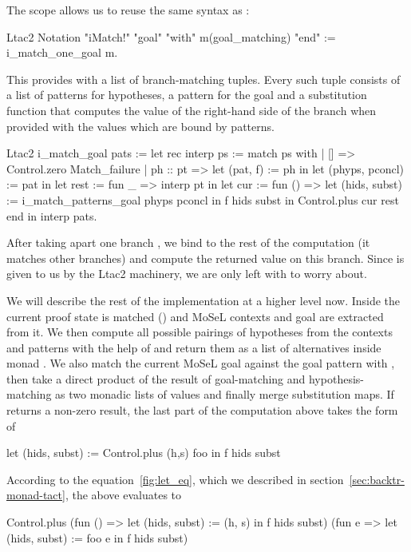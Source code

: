 The  scope allows us to reuse the same syntax as :
\begin{coq}
Ltac2 Notation "iMatch!" "goal" "with" m(goal_matching) "end" :=
  i_match_one_goal m.
\end{coq}
This provides  with a list of branch-matching tuples.
Every such tuple consists of a list of patterns for hypotheses, a pattern for the goal and a substitution function that computes the value of the right-hand side of the branch when provided with the values which are bound by patterns.

\begin{coq}
Ltac2 i_match_goal pats :=
  let rec interp ps := match ps with
  | [] => Control.zero Match_failure
  | ph :: pt =>
    let (pat, f) := ph in
    let (phyps, pconcl) := pat in
    let rest := fun _ => interp pt in
    let cur := fun () =>
      let (hids, subst) := i_match_patterns_goal phyps pconcl in
      f hids subst
    in Control.plus cur rest
  end in
  interp pats.
\end{coq}

After taking apart one branch , we bind  to the rest of the computation (it matches other branches) and compute the returned value on this branch.
Since  is given to us by the Ltac2 machinery, we are only left with  to worry about.

We will describe the rest of the implementation at a higher level now.
Inside  the current proof state is matched () and MoSeL contexts and goal are extracted from it.
We then compute all possible pairings of hypotheses from the contexts and patterns with the help of  and return them as a list of alternatives inside monad .
We also match the current MoSeL goal against the goal pattern  with , then take a direct product of the result of goal-matching and hypothesis-matching as two monadic lists of values and finally merge substitution maps.
If  returns a non-zero result, the last part of the computation above takes the form of
\begin{coq}
let (hids, subst) := Control.plus (h,s) foo in
f hids subst
\end{coq}

According to the equation~\ref{fig:let_eq}, which we described in section~\ref{sec:backtr-monad-tact}, the above evaluates to
\begin{coq}
Control.plus
  (fun () => let (hids, subst) := (h, s) in
   f hids subst)
  (fun e => let (hids, subst) := foo e in
   f hids subst)
\end{coq}

